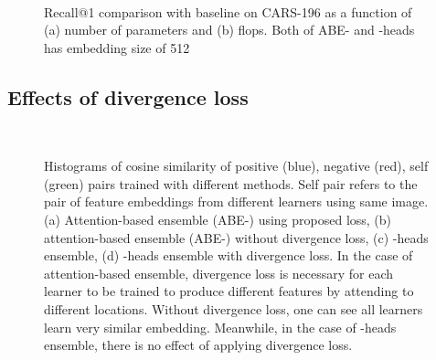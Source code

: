 \documentclass[runningheads]{llncs}
\begin{document}
\begin{figure}[t]
\begin{center}
    \mbox{
\hspace{5mm}
    }
\end{center}
\vspace{-8mm}
\caption{Recall@1 comparison with baseline on CARS-196 as a function of (a) number of parameters and (b) flops. Both of ABE- and -heads has embedding size of 512}
\label{fig:r_vs_x}
\vspace{-3mm}
\end{figure}



\vspace{-3mm}
\subsection{Effects of divergence loss}\label{sec:effectsofdivloss}
\vspace{-1mm}

\begin{figure}[t]
\begin{center}
    \mbox{
    }
\end{center}
\vspace{-7mm}
\caption{Histograms of cosine similarity of positive (blue), negative (red), self (green) pairs trained with different methods. Self pair refers to the pair of feature embeddings from different learners using same image. (a) Attention-based ensemble (ABE-) using proposed loss, (b) attention-based ensemble (ABE-) without divergence loss, (c) -heads ensemble, (d) -heads ensemble with divergence loss. In the case of attention-based ensemble, divergence loss is necessary for each learner to be trained to produce different features by attending to different locations. Without divergence loss, one can see all learners learn very similar embedding. Meanwhile, in the case of -heads ensemble, there is no effect of applying divergence loss.
}
\label{fig:histogram}
\end{figure}
\end{document}
